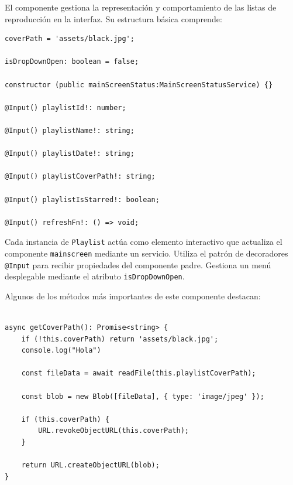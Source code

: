 \documentclass[11pt, a4paper]{article}
\begin{document}
                El componente gestiona la representación y comportamiento de las listas de reproducción en la interfaz. Su estructura básica comprende:

                \begin{lstlisting}[caption={Atributos y Constructora Playlist}]
coverPath = 'assets/black.jpg';

isDropDownOpen: boolean = false;

constructor (public mainScreenStatus:MainScreenStatusService) {}

@Input() playlistId!: number;

@Input() playlistName!: string;

@Input() playlistDate!: string;

@Input() playlistCoverPath!: string;

@Input() playlistIsStarred!: boolean;

@Input() refreshFn!: () => void;
                \end{lstlisting}

                Cada instancia de \verb|Playlist| actúa como elemento interactivo que actualiza el componente \verb|mainscreen| mediante un servicio. Utiliza el patrón de decoradores \verb|@Input| para recibir propiedades del componente padre. Gestiona un menú desplegable mediante el atributo \verb|isDropDownOpen|.
                
                Algunos de los métodos más importantes de este componente destacan:

                \begin{lstlisting}[caption={getCoverPath()}]

async getCoverPath(): Promise<string> {
    if (!this.coverPath) return 'assets/black.jpg';
    console.log("Hola")

    const fileData = await readFile(this.playlistCoverPath);
        
    const blob = new Blob([fileData], { type: 'image/jpeg' });

    if (this.coverPath) {
        URL.revokeObjectURL(this.coverPath);
    }

    return URL.createObjectURL(blob);
}
                \end{lstlisting}
\end{document}
